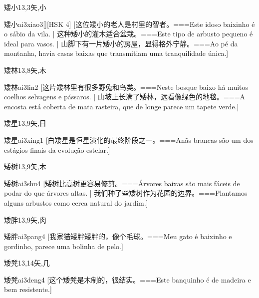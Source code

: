 \begin{Entry}{矮小}{13,3}{⽮,⼩}
  \begin{Phonetics}{矮小}{ai3xiao3}[][HSK 4]
    [这位矮小的老人是村里的智者。===Este idoso baixinho é o sábio da vila. | 这种矮小的灌木适合盆栽。===Este tipo de arbusto pequeno é ideal para vasos. | 山脚下有一片矮小的房屋，显得格外宁静。===Ao pé da montanha, havia casas baixas que transmitiam uma tranquilidade única.]
  \end{Phonetics}
\end{Entry}

\begin{Entry}{矮林}{13,8}{⽮,⽊}
  \begin{Phonetics}{矮林}{ai3lin2}
    [这片矮林里有很多野兔和鸟类。===Neste bosque baixo há muitos coelhos selvagens e pássaros. | 山坡上长满了矮林，远看像绿色的地毯。===A encosta está coberta de mata rasteira, que de longe parece um tapete verde.]
  \end{Phonetics}
\end{Entry}

\begin{Entry}{矮星}{13,9}{⽮,⽇}
  \begin{Phonetics}{矮星}{ai3xing1}
    [白矮星是恒星演化的最终阶段之一。===Anãs brancas são um dos estágios finais da evolução estelar.]
  \end{Phonetics}
\end{Entry}

\begin{Entry}{矮树}{13,9}{⽮,⽊}
  \begin{Phonetics}{矮树}{ai3shu4}
    [矮树比高树更容易修剪。===Árvores baixas são mais fáceis de podar do que árvores altas. | 我们种了些矮树作为花园的边界。===Plantamos alguns arbustos como cerca natural do jardim.]
  \end{Phonetics}
\end{Entry}

\begin{Entry}{矮胖}{13,9}{⽮,⾁}
  \begin{Phonetics}{矮胖}{ai3pang4}
    [我家猫矮胖矮胖的，像个毛球。===Meu gato é baixinho e gordinho, parece uma bolinha de pelo.]
  \end{Phonetics}
\end{Entry}

\begin{Entry}{矮凳}{13,14}{⽮,⼏}
  \begin{Phonetics}{矮凳}{ai3deng4}
    [这个矮凳是木制的，很结实。===Este banquinho é de madeira e bem resistente.]
  \end{Phonetics}
\end{Entry}


